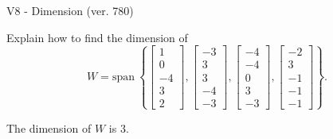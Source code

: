\begin{exercise}
  \begin{exerciseTitle}V8 - Dimension (ver. 780)\end{exerciseTitle}
  \begin{exerciseStatement}
    Explain how to find the dimension of 
\[W=\mathrm{span}\ \left\{\left[\begin{array}{r}
1 \\
0 \\
-4 \\
3 \\
2
\end{array}\right] , \left[\begin{array}{r}
-3 \\
3 \\
3 \\
-4 \\
-3
\end{array}\right] , \left[\begin{array}{r}
-4 \\
-4 \\
0 \\
3 \\
-3
\end{array}\right] , \left[\begin{array}{r}
-2 \\
3 \\
-1 \\
-1 \\
-1
\end{array}\right]\right\}.\]



  \end{exerciseStatement}
  \begin{exerciseAnswer}
   The dimension of \(W\) is  \(3\).
  


  \end{exerciseAnswer}
\end{exercise}